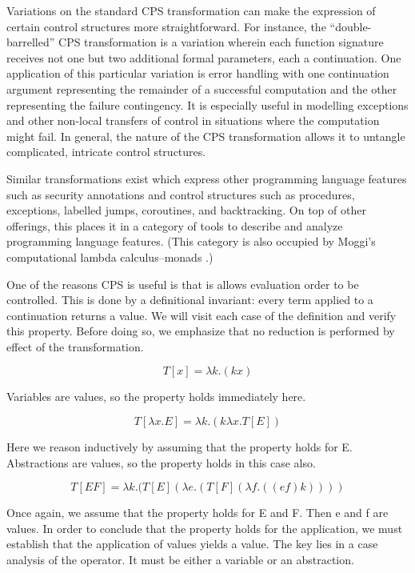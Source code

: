 \documentclass[ms,electronic,twosidetoc,letterpaper,chaptercenter,parttop]{byumsphd}
\begin{document}
Variations on the standard CPS transformation can make the expression of certain 
control structures more straightforward. For instance, the ``double-barrelled'' 
CPS transformation is a variation wherein each function signature receives not 
one but two additional formal parameters, each a continuation. One application 
of this particular variation is error handling with one continuation argument 
representing the remainder of a successful computation and the other representing 
the failure contingency. It is especially useful in modelling exceptions and 
other non-local transfers of control in situations where the computation might fail.
In general, the nature of the CPS transformation allows it to untangle 
complicated, intricate control structures.

Similar transformations exist which express other programming language features 
such as security annotations \cite{wallach2000safkasi} and control structures 
such as procedures, exceptions, labelled jumps, coroutines, and 
backtracking. On top of other offerings, this places it in a category of tools 
to describe and analyze programming language features. (This category is also 
occupied by Moggi's computational lambda calculus--monads 
\cite{moggi1989computational}.)


One of the reasons CPS is useful is that is allows evaluation order to be controlled. This is done by 
a definitional invariant: every term applied to a continuation returns a value. We will visit each 
case of the definition and verify this property. Before doing so, we emphasize that no reduction is 
performed by effect of the transformation.

\[
T[x]=\lambda k.(k x)
\]

Variables are values, so the property holds immediately here.

\[
T[\lambda x.E]=\lambda k.(k \lambda x.T[E])\]

Here we reason inductively by assuming that the property holds for E. Abstractions are values, so the 
property holds in this case also.

\[
T[E F]=\lambda k.(T[E] (\lambda e.(T[F] (\lambda f.((e f) k))))
\]

Once again, we assume that the property holds for E and F. Then e and f are values. In order to conclude 
that the property holds for the application, we must establish that the application of values yields a 
value. The key lies in a case analysis of the operator. It must be either a variable or an abstraction.
\end{document}
